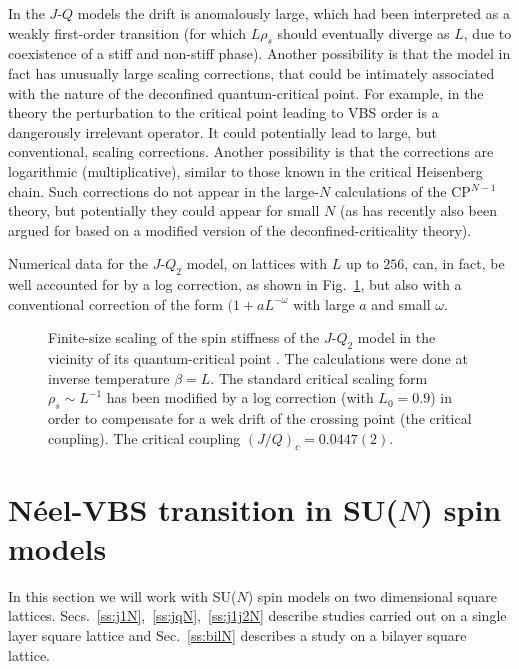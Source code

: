 \documentclass[range]{ar2e}
\begin{document}
In the $J$-$Q$ models the drift is anomalously large, which had been interpreted as a weakly first-order transition (for which $L\rho_s$
should eventually diverge as $L$, due to coexistence of a stiff and non-stiff phase). Another possibility is that the model in fact has unusually
large scaling corrections, that could be intimately associated with the nature of the deconfined quantum-critical point. For example, in the
theory the perturbation to the critical point leading to VBS order is a dangerously irrelevant operator. It could potentially lead to large, but
conventional, scaling corrections. Another possibility is that the corrections are logarithmic (multiplicative), similar to those known in the
critical Heisenberg chain. Such corrections do not appear in the large-$N$ calculations of the CP$^{N-1}$ theory, but potentially they could
appear for small $N$ (as has recently also been argued for based on a modified version of the deconfined-criticality theory).

Numerical data for the $J$-$Q_2$ model, on lattices with $L$ up to $256$, can, in fact, be well accounted for by a log correction, as shown in 
Fig.~\ref{jqrhos}, but also with a conventional correction of the form $(1+aL^{-\omega}$ with large $a$ and small $\omega$.

\begin{figure}
\centerline{}
\caption{Finite-size scaling of the spin stiffness of the $J$-$Q_2$ model in the vicinity of its quantum-critical point \cite{Sandvik10c}. The 
calculations were done at inverse temperature $\beta=L$. The standard critical scaling form $\rho_s \sim L^{-1}$ has been modified by a log correction 
(with $L_0=0.9$) in order to compensate for a wek drift of the crossing point (the critical coupling). The critical coupling $(J/Q)_c = 0.0447(2)$.}
\label{jqrhos}
\end{figure}


\section{N\'eel-VBS transition in SU($N$) spin models}
\label{sec:sunmodels}

In this section we will work with SU($N$) spin models on two
dimensional  square
lattices. Secs.~\ref{ss:j1N},~\ref{ss:jqN},~\ref{ss:j1j2N} describe
studies carried out on a single layer square lattice and
Sec.~\ref{ss:bilN} describes a study on a bilayer square
lattice. 
\end{document}
